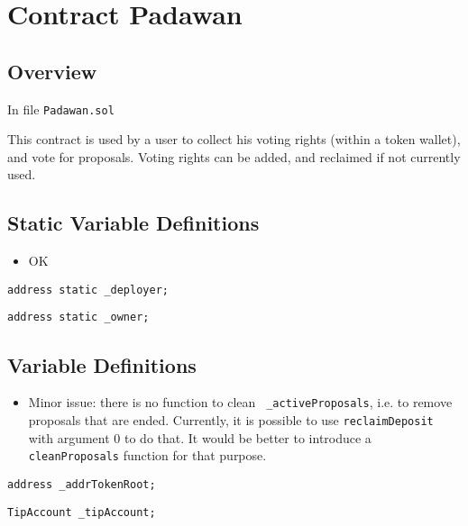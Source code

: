 
\chapter{Contract Padawan}

\minitoc

\section{Overview}

In file {\tt Padawan.sol}

This contract is used by a user to collect his voting rights (within a
token wallet), and vote for proposals. Voting rights can be added, and
reclaimed if not currently used.

\section{Static Variable Definitions}

\begin{itemize}
\item OK
\end{itemize}

\begin{lstlisting}[firstnumber=18]
    address static _deployer;
\end{lstlisting}

\begin{lstlisting}[firstnumber=19]
    address static _owner;
\end{lstlisting}

\section{Variable Definitions}

\begin{itemize}
\item Minor issue: there is no function to clean {\tt
  \_activeProposals}, i.e. to remove proposals that are
  ended. Currently, it is possible to use {\tt reclaimDeposit} with
  argument 0 to do that. It would be better to introduce a {\tt
    cleanProposals} function for that purpose.
\end{itemize}

\begin{lstlisting}[firstnumber=21]
    address _addrTokenRoot;
\end{lstlisting}

\begin{lstlisting}[firstnumber=23]
    TipAccount _tipAccount;
\end{lstlisting}

